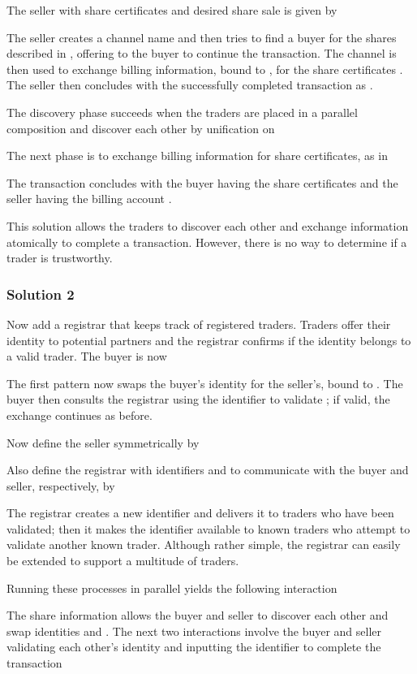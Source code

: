 \documentclass{LMCS}
\begin{document}
The seller  with share certificates  and desired share sale
 is given by

The seller creates a channel name  and then tries to find a buyer
for the shares described in , offering  to the buyer to
continue the transaction. The channel is then used to exchange
billing information, bound to , for the share certificates .
The seller then concludes with the successfully completed transaction
as .

The discovery phase succeeds when the traders are placed in a parallel
composition and discover each other by unification on 

The next phase is to exchange billing information for share certificates, as in

The transaction concludes with the buyer having the share
certificates  and the seller having the billing account .

This solution allows the traders to discover each other and exchange
information atomically to complete a transaction. However, there is no way to
determine if a trader is  trustworthy.

\subsubsection*{Solution 2}
\label{sec:example:sol2}
Now add a registrar that keeps track of registered
traders. Traders offer their identity to potential partners
and the registrar confirms if the identity belongs to a valid trader.
The buyer is now

The first pattern now swaps the buyer's identity  for the seller's, 
bound to . The buyer then consults the registrar using the
identifier  to validate ; if valid, the exchange continues as before.

Now define the seller symmetrically by

Also define the registrar  with identifiers  and  to
communicate with the buyer and seller, respectively, by

The registrar creates a new identifier  and delivers it to traders who
have been validated; then it makes the identifier available to known
traders who attempt to validate another known trader.  Although rather
simple, the registrar can easily be extended to support a multitude of
traders.

Running these processes in parallel yields the following interaction

The share information  allows the buyer and seller to discover
each other and swap identities  and . The next two
interactions involve the buyer and seller validating each other's
identity and inputting the identifier to complete the transaction
\end{document}
